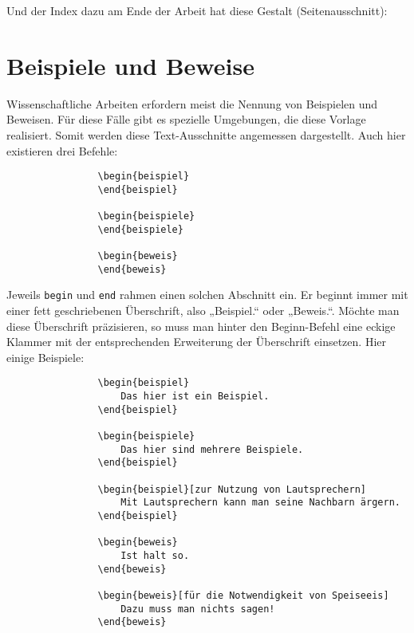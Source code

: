 			Und der Index dazu am Ende der Arbeit hat diese Gestalt (Seitenausschnitt):

			\begin{center}
			\end{center}

		\section{Beispiele und Beweise}

			Wissenschaftliche Arbeiten erfordern meist die Nennung von Beispielen und Beweisen. Für diese Fälle gibt es spezielle Umgebungen, die diese Vorlage realisiert. Somit werden diese Text-Ausschnitte angemessen dargestellt. Auch hier existieren drei Befehle:

			\begin{verbatim}
				\begin{beispiel}
				\end{beispiel}

				\begin{beispiele}
				\end{beispiele}

				\begin{beweis}
				\end{beweis}
			\end{verbatim}\newline

			Jeweils \texttt{begin} und \texttt{end} rahmen einen solchen Abschnitt ein. Er beginnt immer mit einer fett geschriebenen Überschrift, also „Beispiel.“ oder „Beweis.“. Möchte man diese Überschrift präzisieren, so muss man hinter den Beginn-Befehl eine eckige Klammer mit der entsprechenden Erweiterung der Überschrift einsetzen. Hier einige Beispiele:

			\begin{verbatim}
				\begin{beispiel}
					Das hier ist ein Beispiel.
				\end{beispiel}

				\begin{beispiele}
					Das hier sind mehrere Beispiele.
				\end{beispiel}

				\begin{beispiel}[zur Nutzung von Lautsprechern]
					Mit Lautsprechern kann man seine Nachbarn ärgern.
				\end{beispiel}

				\begin{beweis}
					Ist halt so.
				\end{beweis}

				\begin{beweis}[für die Notwendigkeit von Speiseeis]
					Dazu muss man nichts sagen!
				\end{beweis}
			\end{verbatim}\newline

